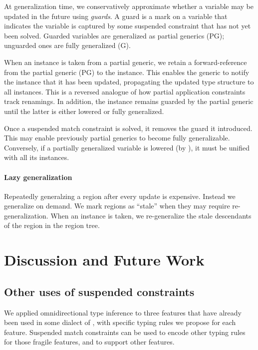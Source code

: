 \documentclass[acmsmall,screen,nonacm,review]{acmart}
\begin{document}
At generalization time, we conservatively approximate whether a variable may be
updated in the future using \emph{guards}. A guard is a mark on a variable that
indicates the variable is captured by some suspended constraint that has not
yet been solved. Guarded variables are generalized as partial generics (PG);
unguarded ones are fully generalized (G).

When an instance is taken from a partial generic, we retain a forward-reference
from the partial generic (PG) to the instance. This enables the generic to
notify the instance that it has been updated, propagating the updated type
structure to all instances. This is a reversed analogue of how partial
application constraints track renamings. In addition, the instance remains
guarded by the partial generic until the latter is either lowered or fully
generalized.

Once a suspended match constraint is solved, it removes the guard it
introduced. This may enable previously partial generics to become fully
generalizable. Conversely, if a partially generalized variable is lowered (\eg by ), it must be unified with all its instances.

\paragraph{Lazy generalization} Repeatedly generalzing a region after every update is expensive.  Instead we generalize on demand. We mark regions as ``stale'' when they may require re-generalization. When an instance is taken, we re-generalize the stale descendants of the region in the region tree.

\section{Discussion and Future Work}
\label{sec:discussion}
\label{sec:future-work}

\subsection{Other uses of suspended constraints}

We applied omnidirectional type inference to three features that have
already been used in some dialect of \ML, with specific typing rules we propose for each feature. Suspended match constraints can be used to encode other typing rules for those fragile features, and to support other features.
\end{document}

